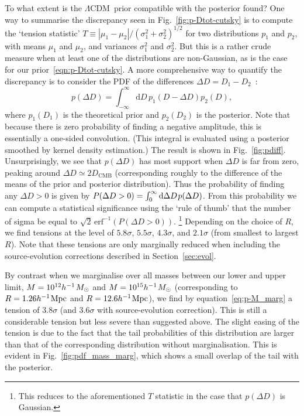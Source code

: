 \documentclass[fleqn,usenatbib]{mnras}
\def\ssp{\hspace{0.09em}}
\def\mrm#1{\mathrm{#1}}
\def\be{\begin{equation}}\def\ee{\end{equation}}
\def\LCDM{$\Lambda$CDM}
\def\dif{\mathrm{d}}
\begin{document}
To what extent is the \LCDM~prior compatible
with the posterior found? 
One way to summarise the discrepancy seen in Fig.~\ref{fig:p-Dtot-cutsky}
is to compute the `tension statistic'
$T\equiv|\mu_1-\mu_2|/(\sigma^2_{1}+\sigma^2_{2})^{1/2}$
for two distributions $p_1$ and $p_2$, with means $\mu_1$ and $\mu_2$,
and variances $\sigma_{1}^2$ and $\sigma_{2}^2$.
But this is a rather crude measure when at least one of the distributions
are non-Gaussian, as is the case for our prior~\eqref{eqn:p-Dtot-cutsky}.
A more comprehensive way to quantify the
discrepancy is to consider the PDF of the differences
$\Delta D=D_1-D_2$~\citep{2019PhRvD..99d3506R}:
\be\label{eqn:shift-pdf}
p(\Delta D)
=\int^\infty_{-\infty}\dif D\,p_1(D-\Delta D)p_2(D),
\ee
where $p_1(D_1)$ is the theoretical prior and $p_2(D_2)$ is the posterior.
Note that because there is zero probability of finding a negative amplitude, this is essentially a one-sided convolution.
(This integral is evaluated using a posterior smoothed by
kernel density estimation.) The result is shown in Fig.~\ref{fig:pdiff}.
Unsurprisingly, we see that $p(\Delta D)$ has
most support when $\Delta D$ is far from zero, peaking around
$\Delta D \simeq 2D_\mrm{CMB}$ (corresponding roughly
to the difference of the means of the prior and posterior
distribution). 
Thus the probability of finding any $\Delta D>0$ is given by
$P(\Delta D>0)=\int^\infty_0\dif\Delta D\ssp p(\Delta D)$.
From this probability we can compute a statistical significance
using the `rule of thumb' that the number of
sigma be equal to
$\sqrt2\,\mrm{erf}^{-1}(P(\Delta D>0))$.%
\footnote{This reduces to the aforementioned $T$ statistic in the case that
$p(\Delta D)$ is Gaussian.}
Depending on the choice of $R$, 
we find tensions at the level of
$5.8\sigma$, $5.5\sigma$, $4.3\sigma$, and
$2.1\sigma$ (from smallest to largest $R$).
Note that these tensions are only marginally reduced when including
the source-evolution corrections described in Section~\ref{sec:evol}.

By contrast when we marginalise over all masses between our lower and upper
limit, $M=10^{12}h^{-1}\ssp M_\odot$ and $M=10^{15}h^{-1}\ssp M_\odot$
(corresponding to $R=1.26h^{-1}\ssp\mrm{Mpc}$
and $R=12.6h^{-1}\ssp\mrm{Mpc}$), we find by equation~\eqref{eq:p-M_marg} a
tension of $3.8\sigma$ (and $3.6\sigma$ with source-evolution correction).
This is still a considerable tension but less severe than suggested above. The
slight easing of the tension is due to the fact that the tail probabilities
of this distribution are larger than that of the corresponding distribution
without marginalisation.
This is evident in Fig.~\ref{fig:pdf_mass_marg}, which shows
a small overlap of the tail with the posterior.
\end{document}
